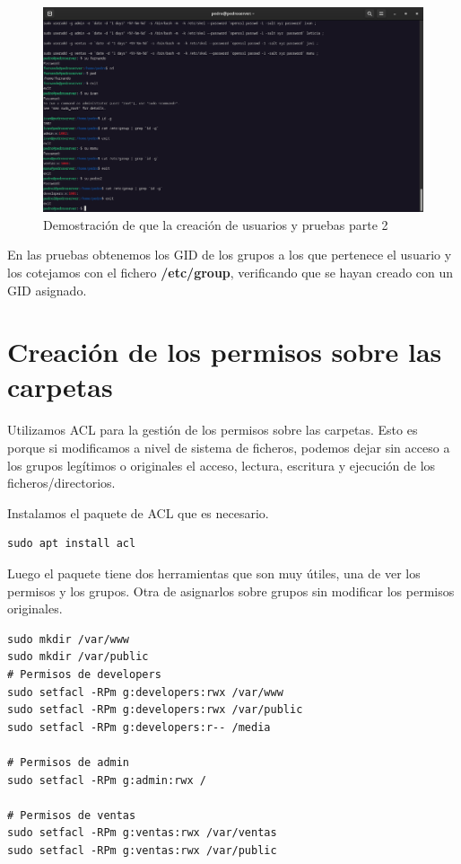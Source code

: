 \begin{figure}[H]
	\centering
	\includegraphics[scale=0.30]{04}
	\caption{Demostración de que la creación de usuarios y pruebas parte 2}
\end{figure}

En las pruebas obtenemos los GID de los grupos a los que pertenece el usuario y los cotejamos con el fichero \textbf{/etc/group}, verificando que se hayan creado con un GID asignado.

\newpage
\section{Creación de los permisos sobre las carpetas}

Utilizamos ACL para la gestión de los permisos sobre las carpetas. Esto es porque si modificamos a nivel de sistema de ficheros, podemos dejar sin acceso a los grupos legítimos o originales el acceso, lectura, escritura y ejecución de los ficheros/directorios.
\vspace{5mm}

Instalamos el paquete de ACL que es necesario.

\begin{lstlisting}[style=mybash]
sudo apt install acl
\end{lstlisting}

Luego el paquete tiene dos herramientas que son muy útiles, una de ver los permisos y los grupos. Otra de asignarlos sobre grupos sin modificar los permisos originales.

\begin{lstlisting}[style=mybash]
sudo mkdir /var/www
sudo mkdir /var/public
# Permisos de developers
sudo setfacl -RPm g:developers:rwx /var/www
sudo setfacl -RPm g:developers:rwx /var/public
sudo setfacl -RPm g:developers:r-- /media

# Permisos de admin
sudo setfacl -RPm g:admin:rwx /

# Permisos de ventas
sudo setfacl -RPm g:ventas:rwx /var/ventas
sudo setfacl -RPm g:ventas:rwx /var/public
\end{lstlisting}

